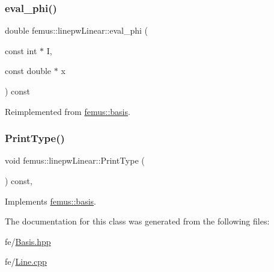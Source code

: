 \mbox{\label{classfemus_1_1linepw_linear_aaf2ad7bcf89fee3022a36b677872ae23}} 
\subsubsection{\texorpdfstring{eval\+\_\+phi()}{eval\_phi()}}
{\footnotesize\ttfamily double femus\+::linepw\+Linear\+::eval\+\_\+phi (\begin{DoxyParamCaption}\item[{const int $\ast$}]{I,  }\item[{const double $\ast$}]{x }\end{DoxyParamCaption}) const\hspace{0.3cm}{\ttfamily [virtual]}}



Reimplemented from \mbox{\hyperlink{classfemus_1_1basis_a89b0797cdccffae5ff6d059b32016ae5}{femus\+::basis}}.

\mbox{\label{classfemus_1_1linepw_linear_a0f482e5b4646b44faebfaeb6d085219a}} 
\subsubsection{\texorpdfstring{Print\+Type()}{PrintType()}}
{\footnotesize\ttfamily void femus\+::linepw\+Linear\+::\+Print\+Type (\begin{DoxyParamCaption}{ }\end{DoxyParamCaption}) const\hspace{0.3cm}{\ttfamily [inline]}, {\ttfamily [virtual]}}



Implements \mbox{\hyperlink{classfemus_1_1basis_abbae7bf8f31ec5793c911bc6d4ea0572}{femus\+::basis}}.



The documentation for this class was generated from the following files\+:\begin{DoxyCompactItemize}
\item 
fe/\mbox{\hyperlink{_basis_8hpp}{Basis.\+hpp}}\item 
fe/\mbox{\hyperlink{fe_2_line_8cpp}{Line.\+cpp}}\end{DoxyCompactItemize}
